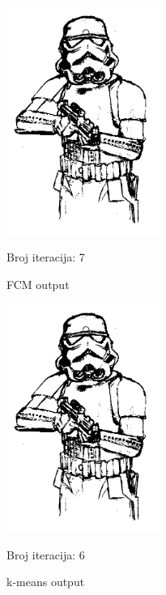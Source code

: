 \documentclass[12pt,a4paper]{article}
\theoremstyle{definition}
\theoremstyle{remark}
\theoremstyle{plain}
\begin{document}
\begin{multicols}{2}
\begin{figure}[H]
\centering
\includegraphics[width=5cm]{images/storm_trooper_binarized_fcm.png}
  \caption{FCM output}\label{storm_trooper_fcm}
 Broj iteracija: 7
\end{figure}
\columnbreak
\begin{figure}[H]
\centering
\includegraphics[width=5cm]{images/storm_trooper_binarized_kmeans.png}
  \caption{k-means output}\label{storm_trooper_kmeans}
 Broj iteracija: 6
\end{figure}
\end{multicols}

\newpage
\end{document}
